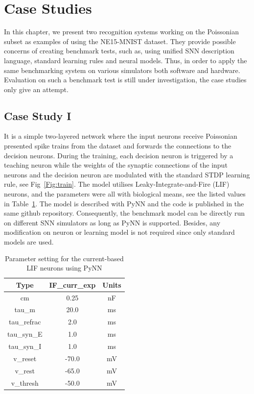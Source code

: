 \section{Case Studies}
\label{sec:test}
In this chapter, we present two recognition systems working on the Poissonian subset as examples of using the NE15-MNIST dataset.
They provide possible concerns of creating benchmark tests, such as, using unified SNN description language, standard learning rules and neural models.
Thus, in order to apply the same benchmarking system on various simulators both software and hardware.
Evaluation on such a benchmark test is still under investigation, the case studies only give an attempt.

\subsection{Case Study I}
It is a simple two-layered network where the input neurons receive Poissonian presented spike trains from the dataset and forwards the connections to the decision neurons.
During the training, each decision neuron is triggered by a teaching neuron while the weights of the synaptic connections of the input neurons and the decision neuron are modulated with the standard STDP learning rule, see Fig~\ref{Fig:train}.
The model utilises Leaky-Integrate-and-Fire (LIF) neurons, and the parameters were all with biological means, see the listed values in Table~\ref{tbl:pynnSetting}.
The model is described with PyNN and the code is published in the same github repository.
Consequently, the benchmark model can be directly run on different SNN simulators as long as PyNN is supported.
Besides, any modification on neuron or learning model is not required since only standard models are used.

\begin{table}[hbbp]
\centering
\caption{\label{tbl:pynnSetting}Parameter setting for the current-based LIF neurons using PyNN}
\begin{tabular}{c|c|c}
\hline
Type & IF\_curr\_exp & Units\\
\hline
cm & 0.25 & nF	\\
tau\_m & 20.0 & ms\\
tau\_refrac & 2.0 & ms\\
tau\_syn\_E & 1.0 & ms\\
tau\_syn\_I & 1.0 & ms\\
v\_reset & -70.0 & mV\\
v\_rest & -65.0 & mV\\
v\_thresh & -50.0 & mV\\
\hline
\end{tabular}
\end{table}

